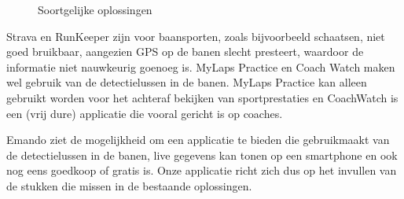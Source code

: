 \begin{figure}[ht]

\caption{Soortgelijke oplossingen}
\label{fig:soortgelijke-oplossingen}
\end{figure}

Strava en RunKeeper zijn voor baansporten, zoals bijvoorbeeld schaatsen, niet goed bruikbaar, aangezien GPS op de banen slecht presteert, waardoor de informatie niet nauwkeurig goenoeg is. MyLaps Practice en Coach Watch maken wel gebruik van de detectielussen in de banen. MyLaps Practice kan alleen gebruikt worden voor het achteraf bekijken van sportprestaties en CoachWatch is een (vrij dure) applicatie die vooral gericht is op coaches.

Emando ziet de mogelijkheid om een applicatie te bieden die gebruikmaakt van de detectielussen in de banen, live gegevens kan tonen op een smartphone en ook nog eens goedkoop of gratis is. Onze applicatie richt zich dus op het invullen van de stukken die missen in de bestaande oplossingen.

